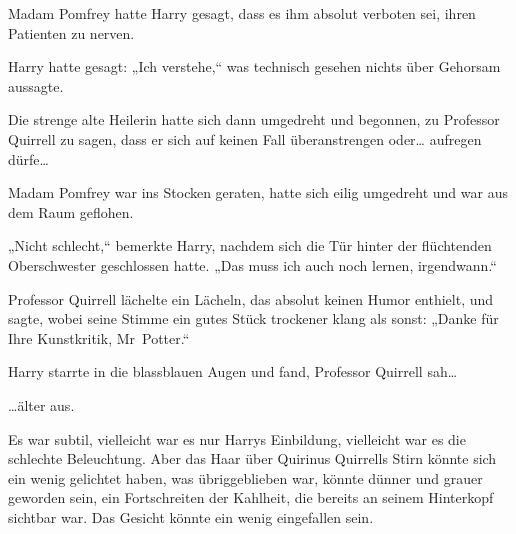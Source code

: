 Madam Pomfrey hatte Harry gesagt, dass es ihm absolut verboten sei, ihren Patienten zu nerven.

Harry hatte gesagt: „Ich verstehe,“ was technisch gesehen nichts über Gehorsam aussagte.

Die strenge alte Heilerin hatte sich dann umgedreht und begonnen, zu Professor Quirrell zu sagen, dass er sich auf keinen Fall überanstrengen oder… aufregen dürfe…

Madam Pomfrey war ins Stocken geraten, hatte sich eilig umgedreht und war aus dem Raum geflohen.

„Nicht schlecht,“ bemerkte Harry, nachdem sich die Tür hinter der flüchtenden Oberschwester geschlossen hatte. „Das muss ich auch noch lernen, irgendwann.“

Professor Quirrell lächelte ein Lächeln, das absolut keinen Humor enthielt, und sagte, wobei seine Stimme ein gutes Stück trockener klang als sonst: „Danke für Ihre Kunstkritik, Mr~Potter.“

Harry starrte in die blassblauen Augen und fand, Professor Quirrell sah…

…älter aus.

Es war subtil, vielleicht war es nur Harrys Einbildung, vielleicht war es die schlechte Beleuchtung. Aber das Haar über Quirinus Quirrells Stirn könnte sich ein wenig gelichtet haben, was übriggeblieben war, könnte dünner und grauer geworden sein, ein Fortschreiten der Kahlheit, die bereits an seinem Hinterkopf sichtbar war. Das Gesicht könnte ein wenig eingefallen sein.

